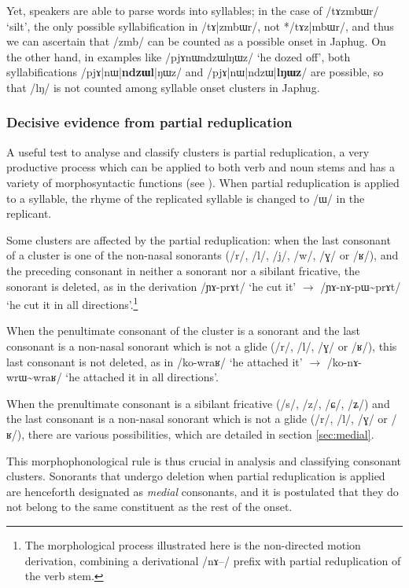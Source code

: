 \documentclass[oldfontcommands,oneside,a4paper,11pt]{article}
\newcommand{\ipa}[1]{{\phon/#1/}} %
\begin{document}
  Yet, speakers are able to parse words into syllables; in the case of \ipa{tɤzmbɯr}  `silt', the only possible syllabification in \ipa{tɤ|zmbɯr}, not *\ipa{tɤz|mbɯr}, and thus we can ascertain that /zmb/ can be counted as a possible onset in Japhug. On the other hand, in examples like \ipa{pjɤnɯndzɯlŋɯz} `he dozed off', both syllabifications \ipa{pjɤ|nɯ|\textbf{ndzɯl}|ŋɯz} and \ipa{pjɤ|nɯ|ndzɯ|\textbf{lŋɯz}} are possible, so that /lŋ/ is not counted among syllable onset clusters in Japhug.
  
  
  \subsubsection{Decisive evidence from partial reduplication} \label{sec:redp}
 A useful test to analyse and classify clusters is partial reduplication, a very productive process which can be applied to both verb and noun stems and has a variety of morphosyntactic functions (see \citealt{jacques07redupl}). When partial reduplication is applied to a syllable, the rhyme of the replicated syllable is changed to \ipa{ɯ} in the replicant.
 
Some clusters are affected by the partial reduplication:   when the last consonant  of a cluster is one of the non-nasal sonorants (\ipa{r}, \ipa{l}, \ipa{j}, \ipa{w}, \ipa{ɣ} or \ipa{ʁ}), and the preceding consonant in neither a sonorant nor a sibilant fricative, the sonorant is deleted, as in the derivation \ipa{ɲɤ-prɤt} `he cut it' $\rightarrow$ \ipa{ɲɤ-nɤ-pɯ\textasciitilde{}prɤt} `he cut it in all directions'.\footnote{The morphological process illustrated here is the non-directed motion derivation, combining a derivational \ipa{nɤ--} prefix with partial reduplication of the verb stem.}
 
 

When the penultimate consonant of the cluster is a sonorant   and the last consonant is a non-nasal sonorant which is not a glide (\ipa{r}, \ipa{l}, \ipa{ɣ} or \ipa{ʁ}), this last consonant  is not deleted, as in  \ipa{ko-wraʁ} `he attached it' $\rightarrow$ \ipa{ko-nɤ-wrɯ\textasciitilde{}wraʁ} `he attached it in all directions'.
  
When the prenultimate consonant is a sibilant fricative   (\ipa{s}, \ipa{z}, \ipa{ɕ}, \ipa{ʑ}) and the last consonant is a non-nasal sonorant which is not a glide (\ipa{r}, \ipa{l}, \ipa{ɣ} or \ipa{ʁ}), there are various possibilities, which are detailed in section \ref{sec:medial}.

This morphophonological rule is thus crucial in analysis and classifying consonant clusters. Sonorants that undergo deletion when partial reduplication is applied are henceforth designated as \textit{medial} consonants, and it is postulated that they do not belong to the same constituent as the rest of the onset.
\end{document}
